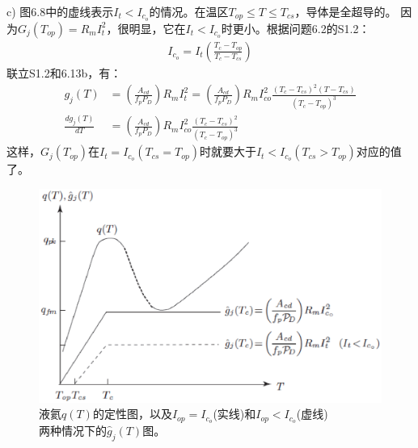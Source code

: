 c) 图6.8中的虚线表示$I_t<I_{c_o}$的情况。在温区$T_{op}\le T\le T_{cs}$，导体是全超导的。
因为$G_j(T_{op})=R_m I_t^2$，很明显，它在$I_t<I_{c_o}$时更小。根据问题6.2的S1.2：
\begin{align*}%
I_{c_o}=I_t(\frac{T_c-T_{op} }{T_c-T_{cs}}) \tag{S1.2}
\end{align*}
联立S1.2和6.13b，有：
\begin{align*}%
g_j(T)&=(\frac{A_{cd}}{f_pP_D})R_mI_t^2=(\frac{A_{cd}}{f_pP_D})R_mI_{co}^2\frac{(T_c-T_{cs})^2(T-T_{cs})}{(T_c-T_{op})^3}\\
\frac{dg_j(T)}{dT}&=(\frac{A_{cd}}{f_pP_D})R_mI_{co}^2\frac{(T_c-T_{cs})^2}{(T_c-T_{op})^3}
\end{align*}
这样，$G_j(T_{op})$在$I_t=I_{c_o}(T_{cs}=T_{op})$时就要大于$I_t<I_{c_o}(T_{cs}>T_{op})$对应的值了。
\begin{figure}[htbp]
	\centering
	\includegraphics[scale=0.7]{chpt6/figs/fig6.8.eps}
	\caption{液氦$q(T)$的定性图，以及$I_{op}=I_{c_o}$(实线)和$I_{op}<I_{c_o}$(虚线)$两种情况下的$$\hat{g}_j(T)$图。}
\end{figure}


